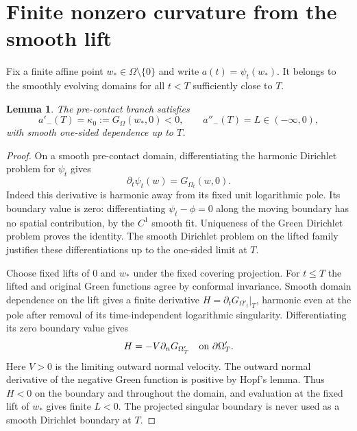 \documentclass[11pt]{article}
\newtheorem{lemma}[theorem]{Lemma}
\begin{document}
\section{Finite nonzero curvature from the smooth lift}
Fix a finite affine point $w_*\in\Omega\setminus\{0\}$ and write
$a(t)=\psi_t(w_*)$. It belongs to the smoothly evolving domains for all
$t<T$ sufficiently close to $T$.

\begin{lemma}\label{lem:left}
The pre-contact branch satisfies
\[
 a'_-(T)=\kappa_0:=G_\Omega(w_*,0)<0,\qquad
 a''_-(T)=L\in(-\infty,0),
\]
with smooth one-sided dependence up to $T$.
\end{lemma}
\begin{proof}
On a smooth pre-contact domain, differentiating the harmonic Dirichlet
problem for $\psi_t$ gives
\[
 \partial_t\psi_t(w)=G_{\Omega_t}(w,0).
\]
Indeed this derivative is harmonic away from its fixed unit logarithmic
pole. Its boundary value is zero: differentiating $\psi_t-\phi=0$ along
the moving boundary has no spatial contribution, by the $C^1$ smooth fit.
Uniqueness of the Green Dirichlet problem proves the identity.
The smooth Dirichlet problem on the lifted family justifies these
differentiations up to the one-sided limit at $T$.

Choose fixed lifts of $0$ and $w_*$ under the fixed covering projection.
For $t\leq T$ the lifted and original Green functions agree by conformal
invariance. Smooth domain dependence on the lift gives a finite derivative
$H=\partial_tG_{\Omega'_t}|_{T}$, harmonic even at the pole after removal
of its time-independent logarithmic singularity. Differentiating its zero
boundary value gives
\[
 H=-V\partial_nG_{\Omega'_T}\quad\hbox{on }\partial\Omega'_T.
\]
Here $V>0$ is the limiting outward normal velocity. The outward normal
derivative of the negative Green function is positive by Hopf's lemma.
Thus $H<0$ on the boundary and throughout the domain, and evaluation at
the fixed lift of $w_*$ gives finite $L<0$. The projected singular boundary
is never used as a smooth Dirichlet boundary at $T$.
\end{proof}
\end{document}

